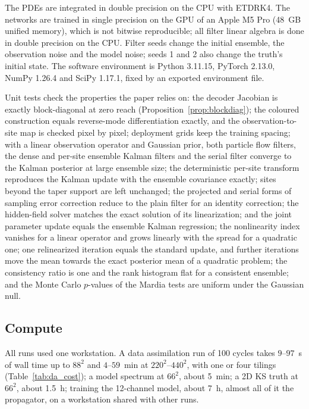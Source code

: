 The PDEs are integrated in double precision on the CPU with ETDRK4. The
networks are trained in single precision on the GPU of an Apple M5 Pro
(48~GB unified memory), which is not bitwise reproducible; all filter
linear algebra is done in double precision on the CPU. Filter seeds change
the initial ensemble, the observation noise and the model noise; seeds 1
and 2 also change the truth's initial state. The software environment is
Python 3.11.15, PyTorch 2.13.0, NumPy 1.26.4 and SciPy 1.17.1, fixed by an
exported environment file.

Unit tests check the properties the paper relies on: the decoder
Jacobian is exactly block-diagonal at zero reach
(Proposition~\ref{prop:blockdiag}); the coloured construction equals
reverse-mode differentiation exactly, and the observation-to-site map is
checked pixel by pixel; deployment grids keep the training spacing; with
a linear observation operator and Gaussian prior, both particle flow
filters, the dense and per-site ensemble Kalman filters and the serial
filter converge to the Kalman posterior at large ensemble size; the
deterministic per-site transform reproduces the Kalman update with the
ensemble covariance exactly; sites beyond the taper support are left
unchanged; the projected and serial forms of sampling error correction
reduce to the plain filter for an identity correction; the hidden-field
solver matches the exact solution of its linearization; and the joint
parameter update equals the ensemble Kalman regression; the nonlinearity
index vanishes for a linear operator and grows linearly with the spread for a
quadratic one; one relinearized iteration equals the standard update, and
further iterations move the mean towards the exact posterior mean of a
quadratic problem; the consistency ratio is one and the rank histogram flat for a
consistent ensemble; and the Monte Carlo $p$-values of the Mardia tests are
uniform under the Gaussian null.

\subsection{Compute}

All runs used one workstation. A data assimilation run of 100 cycles takes
$9$--$97$~s of wall time up to $88^2$ and $4$--$59$~min at $220^2$--$440^2$, with one or four
tilings (Table~\ref{tab:da_cost}); a model spectrum at $66^2$, about 5~min; a
2D KS truth at $66^2$, about 1.5~h; training the 12-channel model, about 7~h, almost all of it the propagator, on a workstation shared with other runs.
